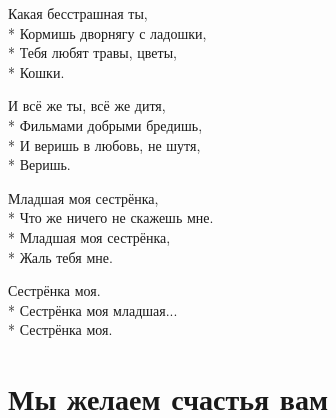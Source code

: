 \medskip

\begin{minipage}{\linewidth}
Какая бесстрашная ты,\\*
Кормишь дворнягу с ладошки,\\*
Тебя любят травы, цветы,\\*
Кошки.\\
\end{minipage}\par\medskip\nobreak

\medskip

\begin{minipage}{\linewidth}
И всё же ты, всё же дитя,\\*
Фильмами добрыми бредишь,\\*
И веришь в любовь, не шутя,\\*
Веришь.\\
\end{minipage}\par\medskip\nobreak

\medskip

\begin{minipage}{\linewidth}
\hspace*{1.5em}Младшая моя сестрёнка,\\*
\hspace*{1.5em}Что же ничего не скажешь мне.\\*
\hspace*{1.5em}Младшая моя сестрёнка,\\*
\hspace*{1.5em}Жаль тебя мне.\\
\end{minipage}\par\medskip\nobreak

\medskip

\begin{minipage}{\linewidth}
\hspace*{1.5em}Сестрёнка моя.\\*
\hspace*{1.5em}Сестрёнка моя младшая...\\*
\hspace*{1.5em}Сестрёнка моя.\\
\end{minipage}

\vspace{\fill}\newpage

\section{Мы желаем счастья вам}
\label{song:Мы_желаем_счастья_вам}

